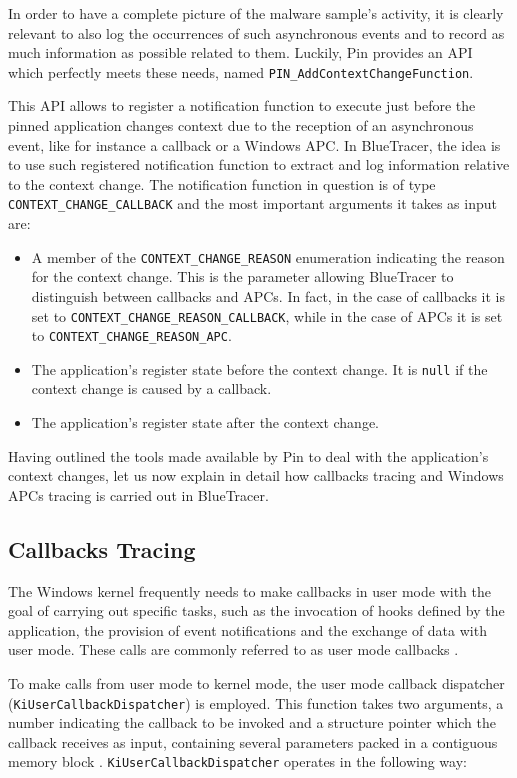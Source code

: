 In order to have a complete picture of the malware sample's activity, it is clearly relevant to also log the occurrences of such asynchronous events and to record as much information as possible related to them. Luckily, Pin provides an API which perfectly meets these needs, named \texttt{PIN\_AddContextChangeFunction}.
 
This API allows to register a notification function to execute just before the pinned application changes context due to the reception of an asynchronous event, like for instance a callback or a Windows APC. In BlueTracer, the idea is to use such registered notification function to extract and log information relative to the context change. The notification function in question is of type \texttt{CONTEXT\_CHANGE\_CALLBACK} and the most important arguments it takes as input are:
\begin{itemize}
\item A member of the \texttt{CONTEXT\_CHANGE\_REASON} enumeration indicating the reason for the context change. This is the parameter allowing BlueTracer to distinguish between callbacks and APCs. In fact, in the case of callbacks it is set to \texttt{CONTEXT\_CHANGE\_REASON\_CALLBACK}, while in the case of APCs it is set to \texttt{CONTEXT\_CHANGE\_REASON\_APC}. 
\item The application's register state before the context change. It is \texttt{null} if the context change is caused by a callback.
\item The application's register state after the context change.  
\end{itemize}      

Having outlined the tools made available by Pin to deal with the application's context changes, let us now explain in detail how callbacks tracing and Windows APCs tracing is carried out in BlueTracer.

\subsection{Callbacks Tracing}

The Windows kernel frequently needs to make callbacks in user mode with the goal of carrying out specific tasks, such as the invocation of hooks defined by the application, the provision of event notifications and the exchange of data with user mode. These calls are commonly referred to as user mode callbacks \cite{UMCallbacks}. 

To make calls from user mode to kernel mode, the user mode callback dispatcher (\texttt{KiUserCallbackDispatcher}) is employed. This function takes two arguments, a number indicating the callback to be invoked and a structure pointer which the callback receives as input, containing several parameters packed in a contiguous memory block \cite{UCDispatcher}. \texttt{KiUserCallbackDispatcher} operates in the following way:

